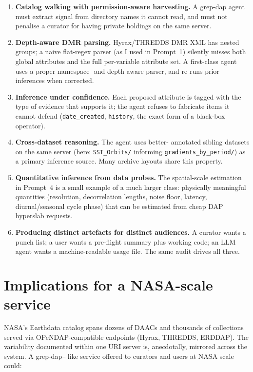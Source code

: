 \documentclass[11pt]{article}
\begin{document}
\begin{enumerate}[leftmargin=2em,topsep=2pt]
  \item \textbf{Catalog walking with permission-aware harvesting.}
    A grep-dap agent must extract signal from directory names it
    cannot read, and must not penalise a curator for having
    private holdings on the same server.
  \item \textbf{Depth-aware DMR parsing.} Hyrax/THREDDS DMR XML
    has nested groups; a naive flat-regex parser (as I used in
    Prompt~1) silently misses both global attributes and the
    full per-variable attribute set. A first-class agent uses a
    proper namespace- and depth-aware parser, and re-runs prior
    inferences when corrected.
  \item \textbf{Inference under confidence.} Each proposed
    attribute is tagged with the type of evidence that supports
    it; the agent refuses to fabricate items it cannot defend
    (\texttt{date\_created}, \texttt{history}, the exact form of
    a black-box operator).
  \item \textbf{Cross-dataset reasoning.} The agent uses better-
    annotated sibling datasets on the same server (here:
    \texttt{SST\_Orbits/} informing \texttt{gradients\_by\_period/})
    as a primary inference source. Many archive layouts share
    this property.
  \item \textbf{Quantitative inference from data probes.} The
    spatial-scale estimation in Prompt~4 is a small example of a
    much larger class: physically meaningful quantities
    (resolution, decorrelation lengths, noise floor, latency,
    diurnal/seasonal cycle phase) that can be estimated from
    cheap DAP hyperslab requests.
  \item \textbf{Producing distinct artefacts for distinct
    audiences.} A curator wants a punch list; a user wants a
    pre-flight summary plus working code; an LLM agent wants a
    machine-readable usage file. The same audit drives all three.
\end{enumerate}

\section{Implications for a NASA-scale service}\label{sec:nasa}

NASA's Earthdata catalog spans dozens of DAACs and thousands of
collections served via OPeNDAP-compatible endpoints (Hyrax,
THREDDS, ERDDAP). The variability documented within one URI
server is, anecdotally, mirrored across the system. A grep-dap--
like service offered to curators and users at NASA scale could:
\end{document}

